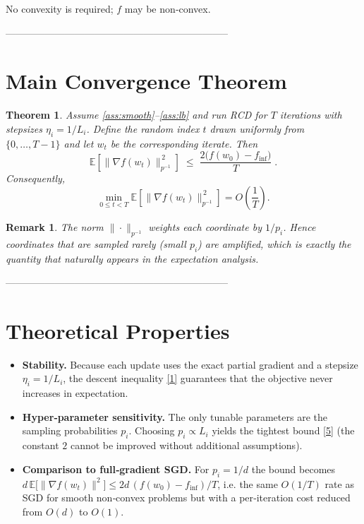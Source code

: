 \documentclass{article}
\newcommand{\E}{\mathbb{E}}
\newtheorem{theorem}{Theorem}
\newtheorem{remark}{Remark}
\begin{document}
No convexity is required; $f$ may be non‑convex.

--------------------------------------------------------------------

\section*{Main Convergence Theorem}
\begin{theorem}\label{thm:main}
Assume \ref{ass:smooth}–\ref{ass:lb} and run RCD for $T$ iterations with stepsizes $\eta_i=1/L_i$.
Define the random index $t$ drawn uniformly from $\{0,\dots,T-1\}$ and let $w_t$ be the corresponding iterate.
Then
\[
\E\!\left[\big\|\nabla f(w_t)\big\|_{p^{-1}}^{\,2}\right]
\;\le\;
\frac{2\big(f(w_0)-f_{\inf}\big)}{T}\; .
\tag{5}
\]
Consequently,
\[
\min_{0\le t<T}\E\!\left[\big\|\nabla f(w_t)\big\|_{p^{-1}}^{\,2}\right]
=O\!\left(\frac{1}{T}\right).
\]
\end{theorem}

\begin{remark}
The norm $\|\cdot\|_{p^{-1}}$ weights each coordinate by $1/p_i$. Hence coordinates that are sampled rarely (small $p_i$) are amplified, which is exactly the quantity that naturally appears in the expectation analysis.
\end{remark}

--------------------------------------------------------------------

\section*{Theoretical Properties}
\begin{itemize}
\item \textbf{Stability.} Because each update uses the exact partial gradient and a stepsize $\eta_i=1/L_i$, the descent inequality \eqref{1} guarantees that the objective never increases in expectation.
\item \textbf{Hyper‑parameter sensitivity.} The only tunable parameters are the sampling probabilities $p_i$. Choosing $p_i\propto L_i$ yields the tightest bound \eqref{5} (the constant $2$ cannot be improved without additional assumptions).
\item \textbf{Comparison to full‑gradient SGD.} For $p_i=1/d$ the bound becomes $d\,\E\!\big[\|\nabla f(w_t)\|^{2}\big]\le 2d\,(f(w_0)-f_{\inf})/T$, i.e. the same $O(1/T)$ rate as SGD for smooth non‑convex problems but with a per‑iteration cost reduced from $O(d)$ to $O(1)$.
\end{itemize}
\end{document}
